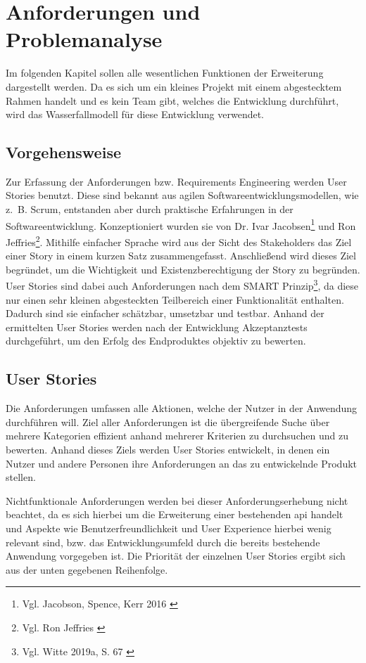 \chapter{Anforderungen und Problemanalyse}
\label{ch:anforderungen}

Im folgenden Kapitel sollen alle wesentlichen Funktionen der Erweiterung dargestellt werden. Da es sich um ein kleines Projekt mit einem abgestecktem Rahmen handelt und es kein Team gibt, welches die Entwicklung durchführt, wird das Wasserfallmodell für diese Entwicklung verwendet.


\section{Vorgehensweise}

Zur Erfassung der Anforderungen bzw. Requirements Engineering werden User Stories benutzt. Diese sind bekannt aus agilen Softwareentwicklungsmodellen, wie z. B. Scrum, entstanden aber durch praktische Erfahrungen in der Softwareentwicklung.
Konzeptioniert wurden sie von Dr. Ivar Jacobsen\footnote{Vgl. Jacobson, Spence, Kerr 2016 \cite{jacobson2016}} und Ron Jeffries\footnote{Vgl. Ron Jeffries \cite{jeffries2022}}.
Mithilfe einfacher Sprache wird aus der Sicht des Stakeholders das Ziel einer Story in einem kurzen Satz zusammengefasst.
Anschließend wird dieses Ziel begründet, um die Wichtigkeit und Existenzberechtigung der Story zu begründen.
User Stories sind dabei auch Anforderungen nach dem SMART Prinzip\footnote{Vgl. Witte 2019a, S. 67 \cite{witte2016}}, da diese nur einen sehr kleinen abgesteckten Teilbereich einer Funktionalität enthalten.
Dadurch sind sie einfacher schätzbar, umsetzbar und testbar. Anhand der ermittelten User Stories werden nach der Entwicklung Akzeptanztests durchgeführt, um den Erfolg des Endproduktes objektiv zu bewerten.

\section{User Stories}

Die Anforderungen umfassen alle Aktionen, welche der Nutzer in der Anwendung durchführen will.
Ziel aller Anforderungen ist die übergreifende Suche über mehrere Kategorien effizient anhand mehrerer Kriterien zu durchsuchen und zu bewerten.
Anhand dieses Ziels werden User Stories entwickelt, in denen ein Nutzer und andere Personen ihre Anforderungen an das zu entwickelnde Produkt stellen.

Nichtfunktionale Anforderungen werden bei dieser Anforderungserhebung nicht beachtet, da es sich hierbei um die Erweiterung einer bestehenden \gls{api} handelt und Aspekte wie Benutzerfreundlichkeit und User Experience hierbei wenig relevant sind, bzw. das Entwicklungsumfeld durch die bereits bestehende Anwendung vorgegeben ist.
Die Priorität der einzelnen User Stories ergibt sich aus der unten gegebenen Reihenfolge.

